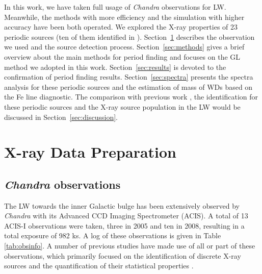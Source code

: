 \documentclass[fleqn,usenatbib]{mnras}
\begin{document}
In this work, we have taken full usage of \emph{Chandra} observations for LW. Meanwhile, the methods with more efficiency and the simulation with higher accuracy have been both operated. We explored the X-ray properties of 23 periodic sources (ten of them identified in \cite{2012ApJ...746..165H}). 
Section~\ref{sec:obs} describes the observation we used and the source detection process. Section~\ref{sec:methods} gives a brief overview about the main methods for period finding and focuses on the GL method we adopted in this work. 
Section~\ref{sec:results} is devoted to the confirmation of period finding results.
Section~\ref{sec:spectra} presents the spectra analysis for these periodic sources and the estimation of mass of WDs based on the Fe line diagnostic. 
The comparison with previous work , the identification for these periodic sources and the X-ray source population in the LW would be discussed in Section~\ref{sec:discussion}.

\section{X-ray Data Preparation} \label{sec:obs}
\subsection{{\it Chandra} observations} \label{subsec:xdata}
The LW towards the inner Galactic bulge has been extensively observed by {\it Chandra} with its Advanced CCD Imaging Spectrometer (ACIS).
A total of 13 ACIS-I observations were taken, three in 2005 and ten in 2008, resulting in a total exposure of 982 ks.
A log of these observations is given in Table \ref{tab:obsinfo}. 
A number of previous studies have made use of all or part of these observations, which primarily focused on the identification of discrete X-ray sources and the quantification of their statistical properties \citep{2009Natur.458.1142R,2009ApJ...700.1702V,2009ApJ...706..223H,2011MNRAS.414..495R,2012MNRAS.427.1633H,2013ApJ...766...14M,2016MNRAS.462L.106W}.
\end{document}
